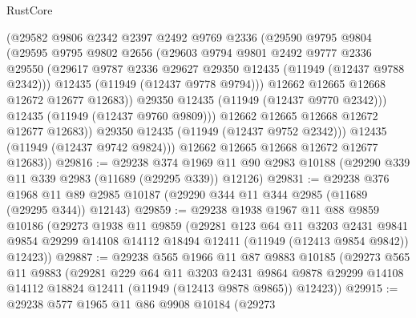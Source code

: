 \begin{lexlean}{RustCore}
\begin{coremodule}
                  (@29582
                    @9806
                    @2342
                    @2397
                    @2492
                    @9769
                    @2336
                    (@29590
                      @9795
                      @9804
                      (@29595
                        @9795
                        @9802
                        @2656
                        (@29603
                          @9794
                          @9801
                          @2492
                          @9777
                          @2336
                          @29550
                          (@29617 @9787 @2336 @29627 @29350 @12435 (@11949 (@12437 @9788 @2342)))
                          @12435
                          (@11949 (@12437 @9778 @9794)))
                        @12662
                        @12665
                        @12668
                        @12672
                        @12677
                        @12683))
                    @29350
                    @12435
                    (@11949 (@12437 @9770 @2342)))
                  @12435
                  (@11949 (@12437 @9760 @9809)))
                @12662
                @12665
                @12668
                @12672
                @12677
                @12683))
            @29350
            @12435
            (@11949 (@12437 @9752 @2342)))
          @12435
          (@11949 (@12437 @9742 @9824)))
        @12662
        @12665
        @12668
        @12672
        @12677
        @12683))
@29816 := @29238
    @374
    @1969
    @11
    @90
    @2983
    @10188
    (@29290 @339 @11 @339 @2983 (@11689 (@29295 @339)) @12126)
@29831 := @29238
    @376
    @1968
    @11
    @89
    @2985
    @10187
    (@29290 @344 @11 @344 @2985 (@11689 (@29295 @344)) @12143)
@29859 := @29238
    @1938
    @1967
    @11
    @88
    @9859
    @10186
    (@29273
      @1938
      @11
      @9859
      (@29281
        @123
        @64
        @11
        @3203
        @2431
        @9841
        @9854
        @29299
        @14108
        @14112
        @18494
        @12411
        (@11949 (@12413 @9854 @9842))
        @12423))
@29887 := @29238
    @565
    @1966
    @11
    @87
    @9883
    @10185
    (@29273
      @565
      @11
      @9883
      (@29281
        @229
        @64
        @11
        @3203
        @2431
        @9864
        @9878
        @29299
        @14108
        @14112
        @18824
        @12411
        (@11949 (@12413 @9878 @9865))
        @12423))
@29915 := @29238
    @577
    @1965
    @11
    @86
    @9908
    @10184
    (@29273

\end{coremodule}
\end{lexlean}
